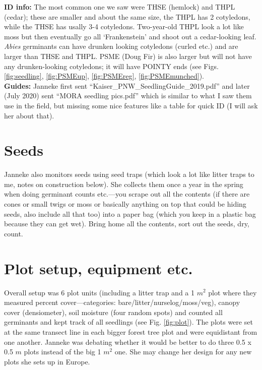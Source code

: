 \documentclass[11pt,letter]{article}
\begin{document}
{\bf ID info:} The most common one we saw were THSE (hemlock) and THPL (cedar); these are smaller and about the same size, the THPL has 2 cotyledons, while the THSE has usally 3-4 cotyledons. Two-year-old THPL look a lot like moss but then eventually go all `Frankenstein' and shoot out a cedar-looking leaf. \emph{Abies} germinants can have drunken looking cotyledons (curled etc.) and are larger than THSE and THPL. PSME (Doug Fir) is also larger but will not have any drunken-looking cotyledons; it will have POINTY ends (see Figs. \ref{fig:seedling}, \ref{fig:PSMEup}, \ref{fig:PSMEreg}, \ref{fig:PSMEmunched}). \\

{\bf Guides:} Janneke first sent ``Kaiser\_PNW\_SeedlingGuide\_2019.pdf'' and later (July 2020) sent ``MORA seedling pics.pdf'' which is similar to what I saw them use in the field, but missing some nice features like a table for quick ID (I will ask her about that). 

\section{Seeds}

Janneke also monitors seeds using seed traps (which look a lot like litter traps to me, notes on construction below). She collects them once a year in the spring when doing germinant counts etc.---you scrape out all the contents (if there are cones or small twigs or moss or basically anything on top that could be hiding seeds, also include all that too) into a paper bag (which you keep in a plastic bag because they can get wet). Bring home all the contents, sort out the seeds, dry, count.

\section{Plot setup, equipment etc.}
Overall setup was 6 plot units (including a litter trap and a 1 $m^2$ plot where they measured percent cover---categories: bare/litter/nurselog/moss/veg), canopy cover (densiometer), soil moisture (four random spots) and counted all germinants and kept track of all seedlings (see Fig. \ref{fig:plot}). The plots were set at the same transect line in each bigger forest tree plot and were equidistant from one another. Janneke was debating whether it would be better to do three 0.5 x 0.5 $m$ plots instead of the big 1 $m^2$ one. She may change her design for any new plots she sets up in Europe.\\
\end{document}
